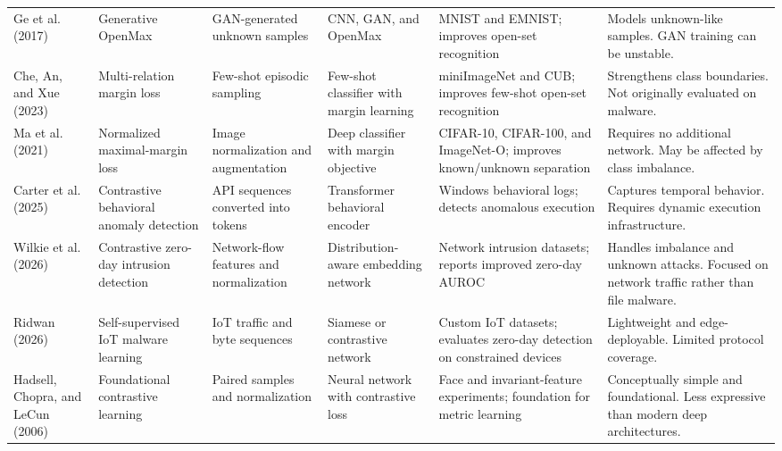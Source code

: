 \documentclass[12pt,a4paper]{article}
\begin{document}
\begin{longtable}{
P{2.2cm}
P{2.7cm}
P{2.7cm}
P{2.8cm}
P{2.7cm}
P{4.0cm}
}
Ge et al. (2017) \citep{ge2017} &
Generative OpenMax &
GAN-generated unknown samples &
CNN, GAN, and OpenMax &
MNIST and EMNIST; improves open-set recognition &
Models unknown-like samples. GAN training can be unstable. \\

Che, An, and Xue (2023) \citep{che2023} &
Multi-relation margin loss &
Few-shot episodic sampling &
Few-shot classifier with margin learning &
miniImageNet and CUB; improves few-shot open-set recognition &
Strengthens class boundaries. Not originally evaluated on malware. \\

Ma et al. (2021) \citep{ma2021} &
Normalized maximal-margin loss &
Image normalization and augmentation &
Deep classifier with margin objective &
CIFAR-10, CIFAR-100, and ImageNet-O; improves known/unknown separation &
Requires no additional network. May be affected by class imbalance. \\

Carter et al. (2025) \citep{carter2025} &
Contrastive behavioral anomaly detection &
API sequences converted into tokens &
Transformer behavioral encoder &
Windows behavioral logs; detects anomalous execution &
Captures temporal behavior. Requires dynamic execution infrastructure. \\

Wilkie et al. (2026) \citep{wilkie2026} &
Contrastive zero-day intrusion detection &
Network-flow features and normalization &
Distribution-aware embedding network &
Network intrusion datasets; reports improved zero-day AUROC &
Handles imbalance and unknown attacks. Focused on network traffic rather than file malware. \\

Ridwan (2026) \citep{ridwan2026} &
Self-supervised IoT malware learning &
IoT traffic and byte sequences &
Siamese or contrastive network &
Custom IoT datasets; evaluates zero-day detection on constrained devices &
Lightweight and edge-deployable. Limited protocol coverage. \\

Hadsell, Chopra, and LeCun (2006) \citep{hadsell2006} &
Foundational contrastive learning &
Paired samples and normalization &
Neural network with contrastive loss &
Face and invariant-feature experiments; foundation for metric learning &
Conceptually simple and foundational. Less expressive than modern deep architectures. \\

\end{longtable}


\clearpage



\end{document}
